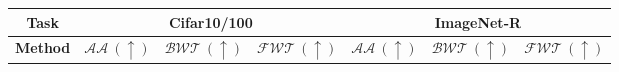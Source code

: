  \begin{table*}[!t]
    \renewcommand{\arraystretch}{1.2}
    \centering
    \begin{tabular}{c | c| c| c |c|c|c }
          \toprule
          \textbf{Task} & \multicolumn{3}{|c|}{\textbf{ Cifar10/100}} & \multicolumn{3}{|c}{\textbf{ImageNet-R}} \\
          \midrule
          \textbf{Method} & $\mathcal{AA}\ (\uparrow)$  & $\mathcal{BWT}\ (\uparrow)$  & $\mathcal{FWT}\ (\uparrow)$  & $\mathcal{AA}\ (\uparrow)$  & $\mathcal{BWT}\ (\uparrow)$  & $\mathcal{FWT}\ (\uparrow)$  \\
          \midrule


\end{tabular}
\end{table*}
